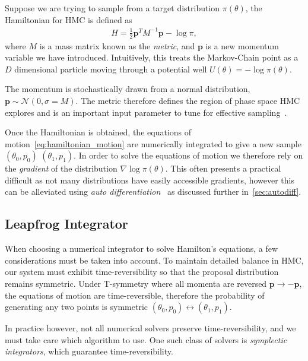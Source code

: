 \documentclass[11pt]{article}
\begin{document}
    Suppose we are trying to sample from a target distribution $\pi(\theta)$, the Hamiltonian for HMC is defined as
    \begin{equation}\label{eq:hmc_hamiltonian}
    \begin{aligned}
        H = \frac{1}{2} \mathbf{p}^T M^{-1} \mathbf{p} - \log \pi,
    \end{aligned}
    \end{equation}
    where $M$ is a mass matrix known as the \emph{metric}, and $\mathbf{p}$ is a new momentum variable we have introduced.
    Intuitively, this treats the Markov-Chain point as a $D$ dimensional particle moving through a
    potential well $U(\theta) = -\log \pi(\theta)$.

    The momentum is stochastically drawn from a normal distribution,
    $\mathbf{p} \sim \mathcal{N}(0, \sigma = M)$.
    The metric therefore defines the region of phase space HMC explores and is an important input parameter to
    tune for effective sampling~\cite{betancourt2016energymetric}.

    Once the Hamiltonian is obtained, the equations of motion~\eqref{eq:hamiltonian_motion} are numerically integrated
    to give a new sample $(\theta_0, p_0)$ \rightarrow $(\theta_1, p_1)$.
    In order to solve the equations of motion we therefore rely on the \emph{gradient} of the
    distribution $\nabla \log \pi(\theta)$.
    This often presents a practical difficult as not many distributions have easily accessible gradients, however this
    can be alleviated using \emph{auto differentiation}~\cite{carpenter2015stan, NEURIPS2020_9332c513, 10.5555/3571885.3571964}
    as discussed further in~\cref{sec:autodiff}.


\subsection{Leapfrog Integrator}\label{subsec:integrator}
    When choosing a numerical integrator to solve Hamilton's equations, a few considerations must be taken into account.
    To maintain detailed balance in HMC, our system must exhibit time-reversibility so that the proposal distribution
    remains symmetric.
    Under T-symmetry where all momenta are reversed $\mathbf{p} \rightarrow -\mathbf{p}$, the equations of motion are
    time-reversible, therefore the probability of generating any two points is
    symmetric $(\theta_0, p_0) \leftrightarrow (\theta_1, p_1)$.

    In practice however, not all numerical solvers preserve time-reversibility, and we must take care which algorithm to use.
    One such class of solvers is \emph{symplectic integrators}, which guarantee time-reversibility.
\end{document}
